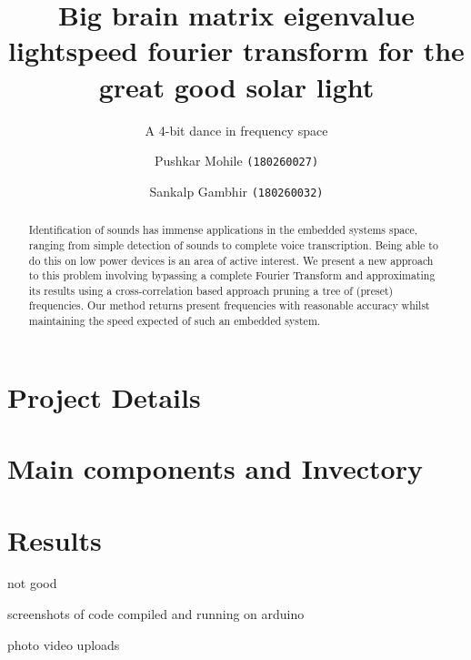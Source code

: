 \documentclass{llncs}
\title{Big brain matrix eigenvalue lightspeed fourier transform for the great good solar light}
\subtitle{A 4-bit dance in frequency space}
\author{Pushkar Mohile \texttt{(180260027)}\inst{1} \and Sankalp Gambhir \texttt{(180260032)}\inst{1}}
\institute{Indian Institute of Technology, Bombay}
\begin{document}
    \maketitle

    \begin{abstract}
    Identification of sounds has immense applications in the embedded systems space,
    ranging from simple detection of sounds to complete voice transcription. Being
    able to do this on low power devices is an area of active interest. We present a
    new approach to this problem involving bypassing a complete Fourier Transform
    and approximating its results using a cross-correlation based approach pruning a
    tree of (preset) frequencies. Our method returns present frequencies with
    reasonable accuracy whilst maintaining the speed expected of such an embedded
    system.
    \end{abstract}

    \section{Project Details}
        

    \section{Main components and Invectory}
        

    \section{Results}
    not good

    screenshots of code compiled and running on arduino
    
    photo video uploads

    \newpage
        
\end{document}
